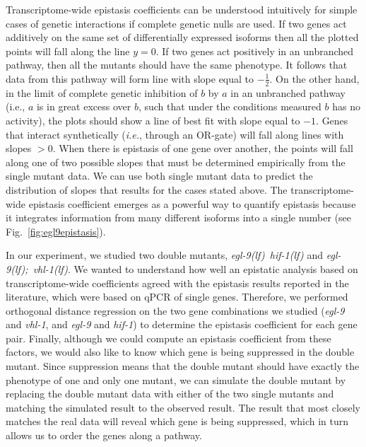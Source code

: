 \documentclass[9pt,twocolumn,twoside]{pnas-new}
\newcommand{\gene}[1]{\mbox{\emph{#1}}}
\newcommand{\eglvhl}{\gene{egl-9(lf); vhl-1(lf)}}
\newcommand{\eglhif}{\gene{egl-9(lf) hif-1(lf)}}
\begin{document}
Transcriptome-wide epistasis coefficients can be understood intuitively for
simple cases of genetic interactions if complete genetic nulls are used. If two
genes act additively on the same set of differentially expressed isoforms then
all the plotted points will fall along the line $y=0$. If two genes act
positively in an unbranched pathway, then all the mutants should have the same
phenotype. It follows that data from this pathway will form line with slope
equal to $-\frac{1}{2}$. On the other hand, in the limit of complete genetic
inhibition of $b$ by $a$ in an unbranched pathway (i.e., $a$ is in great excess
over $b$, such that under the conditions measured $b$ has no activity), the
plots should show a line of best fit with slope equal to $-1$. Genes that
interact synthetically (\emph{i.e.}, through an OR-gate) will fall along lines
with slopes $>0$. When there is epistasis of one gene over another, the points
will fall along one of two possible slopes that must be determined empirically
from the single mutant data. We can use both single mutant data to predict the
distribution of slopes that results for the cases stated above. The
transcriptome-wide epistasis coefficient emerges as a powerful way to quantify
epistasis because it integrates information from many different isoforms into a
single number (see Fig.~\ref{fig:egl9epistasis}).

In our experiment, we studied two double mutants, \eglhif{} and \eglvhl{}. We
wanted to understand how well an epistatic analysis based on transcriptome-wide
coefficients agreed with the epistasis results reported in the literature, which
were based on qPCR of single genes. Therefore, we performed orthogonal distance
regression on the two gene combinations we studied (\gene{egl-9} and
\gene{vhl-1}, and \gene{egl-9} and \gene{hif-1}) to determine the epistasis
coefficient for each gene pair.
\color{purple}
Finally, although we could compute an epistasis
coefficient from these factors, we would also like to know which gene is being
suppressed in the double mutant. Since suppression means that the double mutant
should have exactly the phenotype of one and only one mutant, we can simulate
the double mutant by replacing the double mutant data with either of the two
single mutants and matching the simulated result to the observed result. The
result that most closely matches the real data will reveal which gene is being
suppressed, which in turn allows us to order the genes along a pathway.
\color{black}
\end{document}
